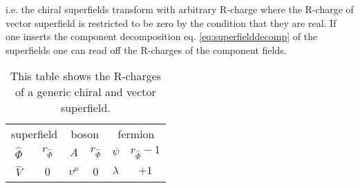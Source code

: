 i.e. the chiral superfields transform with arbitrary R-charge where the R-charge of vector superfield is restricted to be zero by the condition that they are real. If one inserts the component decomposition eq. \ref{eq:superfielddecomp} of the superfields one can read off the R-charges of the component fields.
\begin{table}
\begin{center}
\begin{tabular}{c|c||c|c||c|c}
\multicolumn{2}{c||}{superfield} & \multicolumn{2}{c||}{boson} & \multicolumn{2}{c}{fermion} \\
\hhline{=|=#=|=#=|=}
$\hat{\Phi}$ & $r_{\hat{\Phi}}$ & $A$ & $r_{\hat{\Phi}}$ & $\psi$ & $r_{\hat{\Phi}}-1$\\
$\hat{V}$ & 0 & $v^\mu$ & 0 & $\lambda$ & $+1$
\end{tabular}
\caption{This table shows the R-charges of a generic chiral and vector superfield.}
\end{center}
\end{table}



